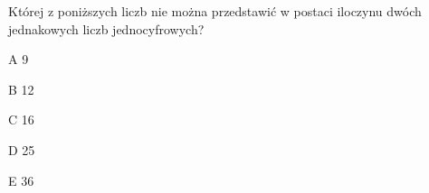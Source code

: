 \begin{tresc}
Której z poniższych liczb nie można przedstawić w postaci iloczynu dwóch jednakowych liczb jednocyfrowych?
\end{tresc}
\begin{wariant}{A} 9 \end{wariant}
\begin{wariant}{B} 12 \end{wariant}
\begin{wariant}{C} 16 \end{wariant}
\begin{wariant}{D} 25 \end{wariant}
\begin{wariant}{E} 36 \end{wariant}
